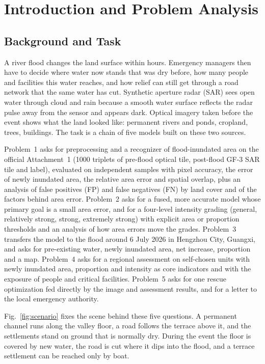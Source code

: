\section[Introduction]{Introduction and Problem Analysis}

\subsection{Background and Task}

A river flood changes the land surface within hours. Emergency managers then have to decide where water now stands that was dry before, how many people and facilities this water reaches, and how relief can still get through a road network that the same water has cut. Synthetic aperture radar (SAR) sees open water through cloud and rain because a smooth water surface reflects the radar pulse away from the sensor and appears dark. Optical imagery taken before the event shows what the land looked like: permanent rivers and ponds, cropland, trees, buildings. The task is a chain of five models built on these two sources.

Problem~1 asks for preprocessing and a recognizer of flood-inundated area on the official Attachment~1 (1000 triplets of pre-flood optical tile, post-flood GF-3 SAR tile and label), evaluated on independent samples with pixel accuracy, the error of newly inundated area, the relative area error and spatial overlap, plus an analysis of false positives (FP) and false negatives (FN) by land cover and of the factors behind area error. Problem~2 asks for a fused, more accurate model whose primary goal is a small area error, and for a four-level intensity grading (general, relatively strong, strong, extremely strong) with explicit area or proportion thresholds and an analysis of how area errors move the grades. Problem~3 transfers the model to the flood around 6 July 2026 in Hengzhou City, Guangxi, and asks for pre-existing water, newly inundated area, net increase, proportion and a map. Problem~4 asks for a regional assessment on self-chosen units with newly inundated area, proportion and intensity as core indicators and with the exposure of people and critical facilities. Problem~5 asks for one rescue optimization fed directly by the image and assessment results, and for a letter to the local emergency authority.

Fig.~\ref{fig:scenario} fixes the scene behind these five questions. A permanent channel runs along the valley floor, a road follows the terrace above it, and the settlements stand on ground that is normally dry. During the event the floor is covered by new water, the road is cut where it dips into the flood, and a terrace settlement can be reached only by boat.

